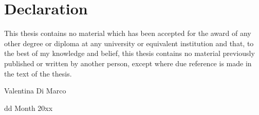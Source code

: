 \section*{Declaration}

\vspace{1cm}

{
  This thesis contains no material which has been accepted for the
  award of any other degree or diploma at any university or equivalent
  institution and that, to the best of my knowledge and belief, this
  thesis contains no material previously published or written by
  another person, except where due reference is made in the text of
  the thesis.
}

\vspace{1cm}


\qquad Valentina Di Marco

\qquad dd Month 20xx


\clearpage
